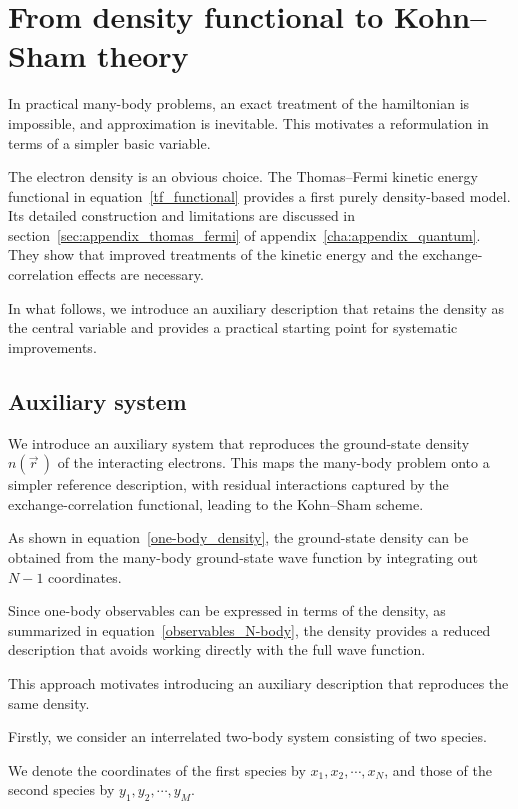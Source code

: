 \newpage
\FloatBarrier
\section{From density functional to Kohn--Sham theory}
\label{sec:from_density_functional_to_Kohn_Sham_theory}

In practical many-body problems, an exact treatment of the hamiltonian is impossible, and approximation is inevitable.
This motivates a reformulation in terms of a simpler basic variable.

The electron density is an obvious choice.
The Thomas--Fermi kinetic energy functional in equation~\eqref{tf_functional} provides a first purely density-based model.
Its detailed construction and limitations are discussed in section~\ref{sec:appendix_thomas_fermi} of appendix~\ref{cha:appendix_quantum}.
They show that improved treatments of the kinetic energy and the exchange-correlation effects are necessary.

In what follows, we introduce an auxiliary description that retains the density as the central variable and provides a practical starting point for systematic improvements.

\FloatBarrier
\subsection{Auxiliary system}

We introduce an auxiliary system that reproduces the ground-state density $n(\vec{r}\,)$ of the interacting electrons.
This maps the many-body problem onto a simpler reference description, with residual interactions captured by the exchange-correlation functional, leading to the Kohn--Sham scheme.

As shown in equation~\eqref{one-body_density}, the ground-state density can be obtained from the many-body ground-state wave function by integrating out $N-1$ coordinates.

Since one-body observables can be expressed in terms of the density, as summarized in equation~\eqref{observables_N-body}, the density provides a reduced description that avoids working directly with the full wave function. 

This approach motivates introducing an auxiliary description that reproduces the same density.

Firstly, we consider an interrelated two-body system consisting of two species.

We denote the coordinates of the first species by $x_1,x_2,\cdots,x_N$,
and those of the second species by $y_1,y_2,\cdots,y_M$.

